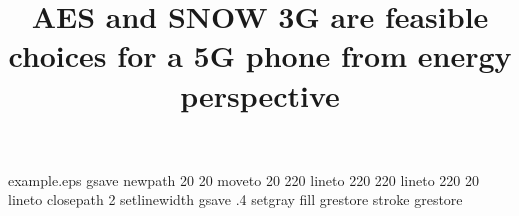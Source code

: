 %
%
%
%
%
\begin{filecontents*}{example.eps}
gsave
newpath
  20 20 moveto
  20 220 lineto
  220 220 lineto
  220 20 lineto
closepath
2 setlinewidth
gsave
  .4 setgray fill
grestore
stroke
grestore
\end{filecontents*}
%
\RequirePackage{fix-cm}
%
\documentclass[twocolumn]{svjour3}       %
%
\smartqed  %
%
\usepackage{graphicx}

\usepackage{color}
\usepackage[numbers]{natbib}
\usepackage{calc}
\usepackage{siunitx}
\DeclareSIUnit\mt{\milli\tesla} %



%
%
%
%
%


\title{AES and SNOW 3G are feasible choices for a 5G phone from energy perspective %
}

